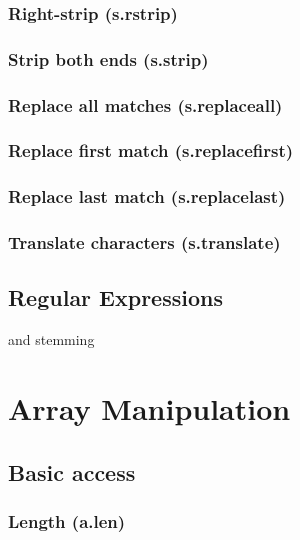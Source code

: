 \documentclass{article}
\theoremstyle{definition}
\begin{document}
\subsubsection{Right-strip (s.rstrip)}

\subsubsection{Strip both ends (s.strip)}

\subsubsection{Replace all matches (s.replaceall)}

\subsubsection{Replace first match (s.replacefirst)}

\subsubsection{Replace last match (s.replacelast)}

\subsubsection{Translate characters (s.translate)}

\subsection{Regular Expressions}

and stemming

\pagebreak

\section{Array Manipulation}

\subsection{Basic access}

\subsubsection{Length (a.len)}
\end{document}
